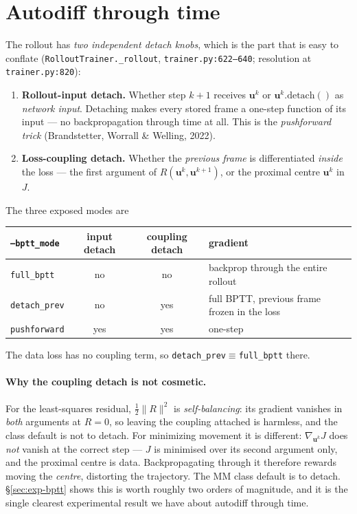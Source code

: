 \documentclass[11pt]{article}
\begin{document}
\section{Autodiff through time}

The rollout has \emph{two independent detach knobs}, which is the part that is easy to conflate
(\texttt{RolloutTrainer.\_rollout}, \texttt{trainer.py:622--640}; resolution at
\texttt{trainer.py:820}):
\begin{enumerate}
   \item \textbf{Rollout-input detach.} Whether step $k{+}1$ receives $\mathbf u^{k}$ or
         $\mathbf u^{k}.\mathrm{detach}()$ as \emph{network input}. Detaching makes every stored
         frame a one-step function of its input --- no backpropagation through time at all. This is
         the \emph{pushforward trick} (Brandstetter, Worrall \& Welling, 2022).
   \item \textbf{Loss-coupling detach.} Whether the \emph{previous frame} is differentiated
         \emph{inside} the loss --- the first argument of $R(\mathbf u^k,\mathbf u^{k+1})$, or the
         proximal centre $\mathbf u^k$ in $J$.
\end{enumerate}
The three exposed modes are
\begin{center}
\begin{tabular}{lccl}
\hline
\texttt{--bptt\_mode} & input detach & coupling detach & gradient \\
\hline
\texttt{full\_bptt}   & no  & no  & backprop through the entire rollout \\
\texttt{detach\_prev} & no  & yes & full BPTT, previous frame frozen in the loss \\
\texttt{pushforward}  & yes & yes & one-step \\
\hline
\end{tabular}
\end{center}
The data loss has no coupling term, so \texttt{detach\_prev}$\equiv$\texttt{full\_bptt} there.

\paragraph{Why the coupling detach is not cosmetic.}
For the least-squares residual, $\tfrac12\|R\|^2$ is \emph{self-balancing}: its gradient vanishes in
\emph{both} arguments at $R=0$, so leaving the coupling attached is harmless, and the class default
is not to detach. For minimizing movement it is different: $\nabla_{\mathbf u^k}J$ does \emph{not}
vanish at the correct step --- $J$ is minimised over its second argument only, and the proximal
centre is data. Backpropagating through it therefore rewards moving the \emph{centre}, distorting
the trajectory. The MM class default is to detach. \S\ref{sec:exp-bptt} shows this is worth roughly
two orders of magnitude, and it is the single clearest experimental result we have about autodiff
through time.
\end{document}
